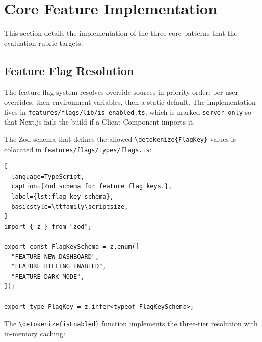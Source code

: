 \documentclass[12pt,a4paper]{report}
\newcommand{\code}[1]{\texttt{\nolinkurl{\detokenize{#1}}}}
\newcommand{\pkg}[1]{\texttt{\nolinkurl{#1}}}
\DeclareRobustCommand{\filename}[1]{\bgroup\urlstyle{tt}\nolinkurl{#1}\egroup}
\begin{document}
\section{Core Feature Implementation}
\label{sec:core-feature-implementation}

This section details the implementation of the three core patterns that the evaluation rubric targets.

\subsection{Feature Flag Resolution}
\label{sec:feature-flag-resolution}

The feature flag system resolves override sources in priority order: per-user overrides, then environment variables, then a static default. The implementation lives in \filename{features/flags/lib/is-enabled.ts}, which is marked \pkg{server-only} so that Next.js fails the build if a Client Component imports it.

The Zod schema that defines the allowed \code{FlagKey} values is colocated in \filename{features/flags/types/flags.ts}:

\begin{lstlisting}[
  language=TypeScript,
  caption={Zod schema for feature flag keys.},
  label={lst:flag-key-schema},
  basicstyle=\ttfamily\scriptsize,
]
import { z } from "zod";

export const FlagKeySchema = z.enum([
  "FEATURE_NEW_DASHBOARD",
  "FEATURE_BILLING_ENABLED",
  "FEATURE_DARK_MODE",
]);

export type FlagKey = z.infer<typeof FlagKeySchema>;
\end{lstlisting}

The \code{isEnabled} function implements the three-tier resolution with in-memory caching:
\end{document}
